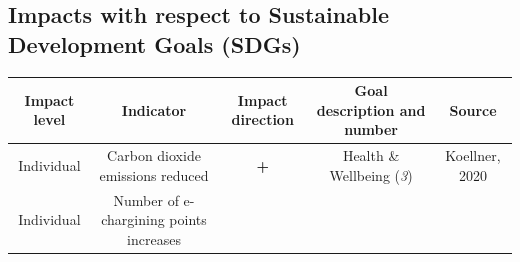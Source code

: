 \documentclass[
]{book}
\begin{document}
\hypertarget{impacts-with-respect-to-sustainable-development-goals-sdgs-10}{%
\subsection*{Impacts with respect to Sustainable Development Goals (SDGs)}\label{impacts-with-respect-to-sustainable-development-goals-sdgs-10}}

\begin{longtable}[]{@{}ccccc@{}}
\toprule
\begin{minipage}[b]{0.17\columnwidth}\centering
Impact level\strut
\end{minipage} & \begin{minipage}[b]{0.16\columnwidth}\centering
Indicator\strut
\end{minipage} & \begin{minipage}[b]{0.17\columnwidth}\centering
Impact direction\strut
\end{minipage} & \begin{minipage}[b]{0.17\columnwidth}\centering
Goal description and number\strut
\end{minipage} & \begin{minipage}[b]{0.17\columnwidth}\centering
Source\strut
\end{minipage}\tabularnewline
\midrule
\endhead
\begin{minipage}[t]{0.17\columnwidth}\centering
Individual\strut
\end{minipage} & \begin{minipage}[t]{0.16\columnwidth}\centering
Carbon dioxide emissions reduced\strut
\end{minipage} & \begin{minipage}[t]{0.17\columnwidth}\centering
\textbf{+}\strut
\end{minipage} & \begin{minipage}[t]{0.17\columnwidth}\centering
Health \& Wellbeing (\emph{3})\strut
\end{minipage} & \begin{minipage}[t]{0.17\columnwidth}\centering
Koellner, 2020\strut
\end{minipage}\tabularnewline
\begin{minipage}[t]{0.17\columnwidth}\centering
Individual\strut
\end{minipage} & \begin{minipage}[t]{0.16\columnwidth}\centering
Number of e-chargining points increases\strut

\end{minipage}
\end{longtable}
\end{document}
